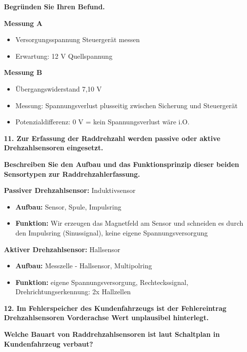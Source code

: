 \textbf{Begründen Sie Ihren Befund.}

\textbf{Messung A}

\begin{itemize}
\item
  Versorgungsspannung Steuergerät messen
\item
  Erwartung: 12 V Quellspannung
\end{itemize}

\textbf{Messung B}

\begin{itemize}
\item
  Übergangswiderstand 7,10 V
\item
  Messung: Spannungsverlust plusseitig zwischen Sicherung und
  Steuergerät
\item
  Potenzialdifferenz: 0 V = kein Spannungsverlust wäre i.O.
\end{itemize}

\textbf{11. Zur Erfassung der Raddrehzahl werden passive oder aktive
Drehzahlsensoren eingesetzt.}

\textbf{Beschreiben Sie den Aufbau und das Funktionsprinzip dieser
beiden Sensortypen zur Raddrehzahlerfassung.}

\textbf{Passiver Drehzahlsensor:} Induktivsensor

\begin{itemize}
\item
  \textbf{Aufbau:} Sensor, Spule, Impulsring
\item
  \textbf{Funktion:} Wir erzeugen das Magnetfeld am Sensor und schneiden
  es durch den Impulsring (Sinussignal), keine eigene
  Spannungsversorgung
\end{itemize}

\textbf{Aktiver Drehzahlsensor:} Hallsensor

\begin{itemize}
\item
  \textbf{Aufbau:} Messzelle - Hallsensor, Multipolring
\item
  \textbf{Funktion:} eigene Spannungsversorgung, Rechteckssignal,
  Drehrichtungserkennung: 2x Hallzellen
\end{itemize}

\newpage

\textbf{12. Im Fehlerspeicher des Kundenfahrzeugs ist der Fehlereintrag
Drehzahlsensoren Vorderachse Wert unplausibel hinterlegt.}

\textbf{Welche Bauart von Raddrehzahlsensoren ist laut Schaltplan in
Kundenfahrzeug verbaut?}

